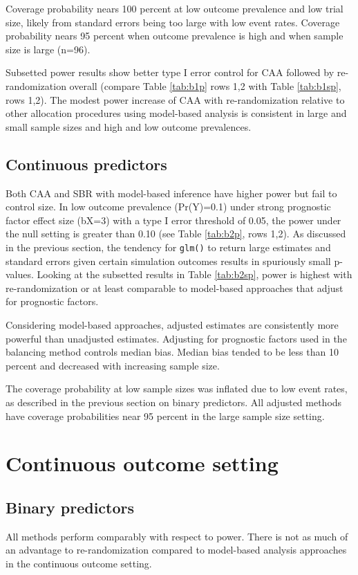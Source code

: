 Coverage probability nears 100 percent at low outcome prevalence and low trial size, likely from standard errors being too large with low event rates.
Coverage probability nears 95 percent when outcome prevalence is high and when sample size is large (n=96).

Subsetted power results show better type I error control for CAA followed by re-randomization overall (compare Table \ref{tab:b1p} rows 1,2 with Table \ref{tab:b1sp}, rows 1,2).
The modest power increase of CAA with re-randomization relative to other allocation procedures using model-based analysis is consistent in large and small sample sizes and high and low outcome prevalences.


\subsection{Continuous predictors}
Both CAA and SBR with model-based inference have higher power but fail to control size.
In low outcome prevalence (Pr(Y)=0.1) under strong prognostic factor effect size (bX=3) with a type I error threshold of 0.05, the power under the null setting is greater than 0.10 (see Table \ref{tab:b2p}, rows 1,2). 
As discussed in the previous section, the tendency for \texttt{glm()} to return large estimates and standard errors given certain simulation outcomes results in spuriously small p-values. 
Looking at the subsetted results in Table \ref{tab:b2sp}, power is highest with re-randomization or at least comparable to model-based approaches that adjust for prognostic factors.

Considering model-based approaches, adjusted estimates are consistently more powerful than unadjusted estimates. 
Adjusting for prognostic factors used in the balancing method controls median bias.
Median bias tended to be less than 10 percent and decreased with increasing sample size.

The coverage probability at low sample sizes was inflated due to low event rates, as described in the previous section on binary predictors.
All adjusted methods have coverage probabilities near 95 percent in the large sample size setting. 

\section{Continuous outcome setting}
\subsection{Binary predictors}
All methods perform comparably with respect to power. 
There is not as much of an advantage to re-randomization compared to model-based analysis approaches in the continuous outcome setting.

